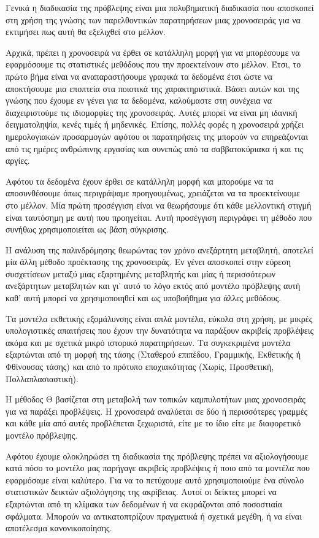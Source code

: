 Γενικά η διαδικασία της πρόβλεψης είναι μια πολυβηματική διαδικασία που αποσκοπεί στη χρήση της γνώσης των παρελθοντικών παρατηρήσεων μιας χρονοσειράς για να εκτιμήσει πως αυτή θα εξελιχθεί στο μέλλον.

Αρχικά, πρέπει η χρονοσειρά να έρθει σε κατάλληλη μορφή για να μπορέσουμε να εφαρμόσουμε τις στατιστικές μεθόδους που την προεκτείνουν στο μέλλον. Έτσι, το πρώτο βήμα είναι να αναπαραστήσουμε γραφικά τα δεδομένα έτσι ώστε να αποκτήσουμε μια εποπτεία στα ποιοτικά της χαρακτηριστικά. Βάσει αυτών και της γνώσης που έχουμε εν γένει για τα δεδομένα, καλούμαστε στη συνέχεια να διαχειριστούμε τις ιδιομορφίες της χρονοσειράς. Αυτές μπορεί να είναι μη ιδανική δειγματοληψία, κενές τιμές ή μηδενικές. Επίσης, πολλές φορές η χρονοσειρά χρήζει ημερολογιακών προσαρμογών αφότου οι παρατηρήσεις της μπορούν να επηρεάζονται από τις ημέρες ανθρώπινης εργασίας και συνεπώς από τα σαββατοκύριακα ή και τις αργίες. 

Αφότου τα δεδομένα έχουν έρθει σε κατάλληλη μορφή και μπορούμε να τα αποσυνθέσουμε όπως περιγράψαμε προηγουμένως, χρειάζεται να τα προεκτείνουμε στο μέλλον. Μία πρώτη προσέγγιση είναι να θεωρήσουμε ότι κάθε μελλοντική στιγμή είναι ταυτόσημη με αυτή που προηγείται. Αυτή προσέγγιση περιγράφει τη μέθοδο  που συνήθως χρησιμοποιείται ως βάση σύγκρισης.

Η ανάλυση της παλινδρόμησης θεωρώντας τον χρόνο ανεξάρτητη μεταβλητή, αποτελεί μία άλλη μέθοδο προέκτασης της χρονοσειράς. Εν γένει αποσκοπεί στην εύρεση συσχετίσεων μεταξύ μιας εξαρτημένης μεταβλητής και μίας ή περισσότερων ανεξάρτητων μεταβλητών και γι' αυτό το λόγο εκτός από μοντέλο πρόβλεψης αυτή καθ' αυτή μπορεί να χρησιμοποιηθεί και ως υποβοήθημα για άλλες μεθόδους.

Τα μοντέλα εκθετικής εξομάλυνσης είναι απλά μοντέλα, εύκολα στη χρήση, με μικρές υπολογιστικές απαιτήσεις που έχουν την δυνατότητα να παράξουν ακριβείς προβλέψεις ακόμα και με σχετικά μικρό ιστορικό παρατηρήσεων. Τα συγκεκριμένα μοντέλα εξαρτώνται από τη μορφή της τάσης (Σταθερού επιπέδου, Γραμμικής, Εκθετικής ή Φθίνουσας τάσης) και από το πρότυπο εποχιακότητας (Χωρίς, Προσθετική, Πολλαπλασιαστική).

Η μέθοδος Θ βασίζεται στη μεταβολή των τοπικών καμπυλοτήτων μιας χρονοσειράς για να παράξει προβλέψεις. Η χρονοσειρά αναλύεται σε δύο ή περισσότερες γραμμές  και κάθε μία από αυτές προβλέπεται ξεχωριστά, είτε με το ίδιο είτε με διαφορετικό μοντέλο πρόβλεψης.

Αφότου έχουμε ολοκληρώσει τη διαδικασία της πρόβλεψης πρέπει να αξιολογήσουμε κατά πόσο το μοντέλο μας παρήγαγε ακριβείς προβλέψεις ή ποιο από τα μοντέλα που εφαρμόσαμε είναι καλύτερο. Για να το πετύχουμε αυτό χρησιμοποιούμε ένα σύνολο στατιστικών δεικτών αξιολόγησης της ακρίβειας. Αυτοί οι δείκτες μπορεί να εξαρτώνται από τη κλίμακα των δεδομένων ή να εκφράζονται από ποσοστιαία σφάλματα. Μπορούν να αντικατοπτρίζουν πραγματικά ή σχετικά μεγέθη, ή να είναι αποτέλεσμα κανονικοποίησης.

